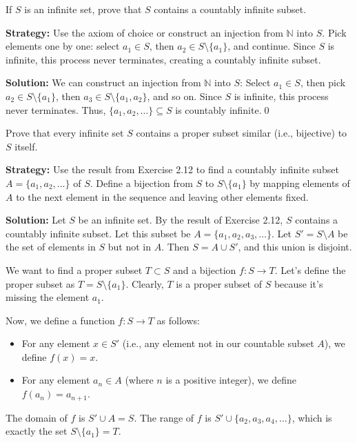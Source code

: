 \begin{problembox}
If \( S \) is an infinite set, prove that \( S \) contains a countably infinite subset.
\end{problembox}

\noindent\textbf{Strategy:} Use the axiom of choice or construct an injection from $\mathbb{N}$ into $S$. Pick elements one by one: select $a_1 \in S$, then $a_2 \in S \setminus \{a_1\}$, and continue. Since $S$ is infinite, this process never terminates, creating a countably infinite subset.

\noindent\bigskip\noindent\textbf{Solution:}  
We can construct an injection from \( \mathbb{N} \) into \( S \):  
Select \( a_1 \in S \), then pick \( a_2 \in S \setminus \{a_1\} \), then \( a_3 \in S \setminus \{a_1, a_2\} \), and so on.  
Since \( S \) is infinite, this process never terminates. Thus, $\{a_1, a_2, \ldots\} \subseteq S$ is countably infinite.\qed



\begin{problembox}
Prove that every infinite set \( S \) contains a proper subset similar (i.e., bijective) to \( S \) itself.
\end{problembox}

\noindent\textbf{Strategy:} Use the result from Exercise 2.12 to find a countably infinite subset $A = \{a_1, a_2, \ldots\}$ of $S$. Define a bijection from $S$ to $S \setminus \{a_1\}$ by mapping elements of $A$ to the next element in the sequence and leaving other elements fixed.

\bigskip\noindent\textbf{Solution:}  
Let $S$ be an infinite set. By the result of Exercise 2.12, $S$ contains a countably infinite subset. Let this subset be $A = \{a_1, a_2, a_3, \dots \}$.
Let $S' = S \setminus A$ be the set of elements in $S$ but not in $A$. Then $S = A \cup S'$, and this union is disjoint.

We want to find a proper subset $T \subset S$ and a bijection $f: S \to T$.
Let's define the proper subset as $T = S \setminus \{a_1\}$. Clearly, $T$ is a proper subset of $S$ because it's missing the element $a_1$.

Now, we define a function $f: S \to T$ as follows:
\begin{itemize}
\item For any element $x \in S'$ (i.e., any element not in our countable subset $A$), we define $f(x) = x$.
\item For any element $a_n \in A$ (where $n$ is a positive integer), we define $f(a_n) = a_{n+1}$.
\end{itemize}
The domain of $f$ is $S' \cup A = S$. The range of $f$ is $S' \cup \{a_2, a_3, a_4, \dots\}$, which is exactly the set $S \setminus \{a_1\} = T$.

